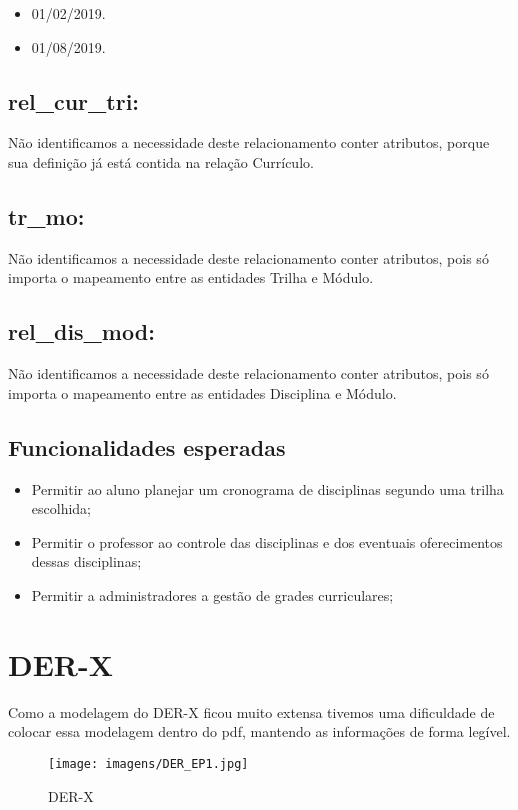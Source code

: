 \documentclass{report}
\begin{document}
\begin{itemize}
  \item 01/02/2019.
  \item 01/08/2019.
\end{itemize}
\subsection{rel\_cur\_tri:}
 Não identificamos a necessidade deste relacionamento conter atributos, porque
 sua definição já está contida na relação Currículo.
\subsection{tr\_mo:}
 Não identificamos a necessidade deste relacionamento conter atributos, pois só
 importa o mapeamento entre as entidades Trilha e Módulo.
\subsection{rel\_dis\_mod:}
 Não identificamos a necessidade deste relacionamento conter atributos, pois só
 importa o mapeamento entre as entidades Disciplina e Módulo.
\subsection{Funcionalidades esperadas}
\begin{itemize}
  \item Permitir ao aluno planejar um cronograma de disciplinas segundo uma trilha
escolhida;
  \item Permitir o professor ao controle das disciplinas e dos eventuais oferecimentos dessas disciplinas;
  \item Permitir a administradores a gestão de
grades curriculares;
\end{itemize}


\break

\section {DER-X}
Como a modelagem do DER-X ficou muito extensa tivemos uma dificuldade de colocar essa modelagem dentro do pdf, mantendo as informações de forma legível.

\begin{figure}[!htb]
     \centering
     \texttt{[image: imagens/DER\_EP1.jpg]}
     \caption{DER-X}
\end{figure}
\end{document}
